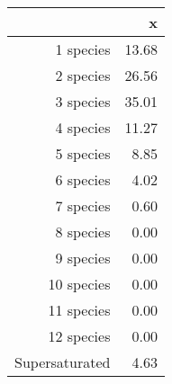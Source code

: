 \begin{table}[ht]
\centering
\begin{tabular}{rr}
  \hline
 & x \\ 
  \hline
1 species & 13.68 \\ 
  2 species & 26.56 \\ 
  3 species & 35.01 \\ 
  4 species & 11.27 \\ 
  5 species & 8.85 \\ 
  6 species & 4.02 \\ 
  7 species & 0.60 \\ 
  8 species & 0.00 \\ 
  9 species & 0.00 \\ 
  10 species & 0.00 \\ 
  11 species & 0.00 \\ 
  12 species & 0.00 \\ 
  Supersaturated & 4.63 \\ 
   \hline
\end{tabular}
\end{table}
